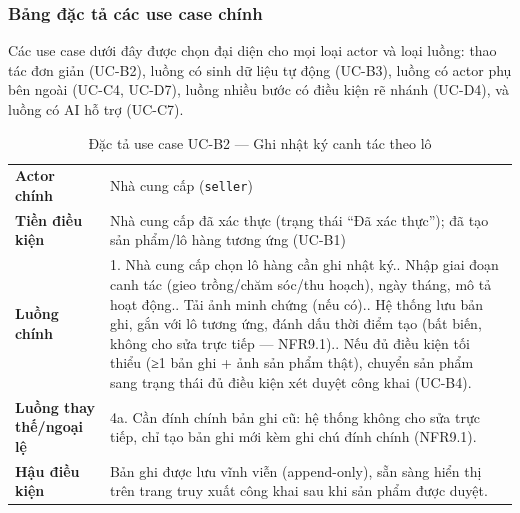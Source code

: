 \subsubsection*{Bảng đặc tả các use case chính}

Các use case dưới đây được chọn đại diện cho mọi loại actor và loại luồng: thao tác đơn giản (UC-B2), luồng có sinh dữ liệu tự động (UC-B3), luồng có actor phụ bên ngoài (UC-C4, UC-D7), luồng nhiều bước có điều kiện rẽ nhánh (UC-D4), và luồng có AI hỗ trợ (UC-C7).

\begin{center}
\renewcommand{\arraystretch}{1.2}
\begin{longtable}{L{2.6cm} L{11.5cm}}
\caption{Đặc tả use case UC-B2 --- Ghi nhật ký canh tác theo lô}
\label{tab:uc-b2} \\
\toprule
{}
 \\
\midrule
\endfirsthead
\bottomrule
\endfoot
\textbf{Actor chính} & Nhà cung cấp (\texttt{seller}) \\
\textbf{Tiền điều kiện} & Nhà cung cấp đã xác thực (trạng thái ``Đã xác thực''); đã tạo sản phẩm/lô hàng tương ứng (UC-B1) \\
\textbf{Luồng chính} &
1. Nhà cung cấp chọn lô hàng cần ghi nhật ký.. Nhập giai đoạn canh tác (gieo trồng/chăm sóc/thu hoạch), ngày tháng, mô tả hoạt động.. Tải ảnh minh chứng (nếu có).. Hệ thống lưu bản ghi, gắn với lô tương ứng, đánh dấu thời điểm tạo (bất biến, không cho sửa trực tiếp --- NFR9.1).. Nếu đủ điều kiện tối thiểu (≥1 bản ghi + ảnh sản phẩm thật), chuyển sản phẩm sang trạng thái đủ điều kiện xét duyệt công khai (UC-B4). \\
\textbf{Luồng thay thế/ngoại lệ} &
4a. Cần đính chính bản ghi cũ: hệ thống không cho sửa trực tiếp, chỉ tạo bản ghi mới kèm ghi chú đính chính (NFR9.1). \\
\textbf{Hậu điều kiện} & Bản ghi được lưu vĩnh viễn (append-only), sẵn sàng hiển thị trên trang truy xuất công khai sau khi sản phẩm được duyệt. \\
\end{longtable}
\end{center}

